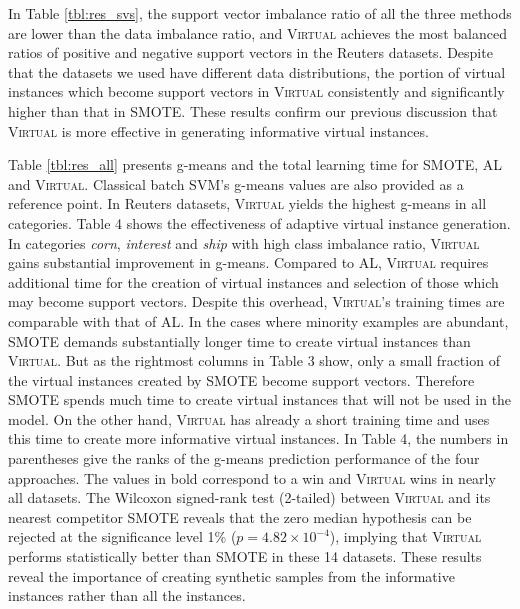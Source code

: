 In Table \ref{tbl:res_svs}, the support vector imbalance ratio of all the three methods are lower than the data imbalance ratio, and \textsc{Virtual} achieves the most balanced ratios of positive and negative support vectors in the Reuters datasets. Despite that the datasets we used have different data distributions, the portion of virtual instances which become support vectors in \textsc{Virtual} consistently and significantly higher than that in SMOTE. These results confirm our previous discussion that \textsc{Virtual} is more effective in generating informative virtual instances.

Table \ref{tbl:res_all} presents g-means and the total learning time for SMOTE, AL and  \textsc{Virtual}. Classical batch SVM's g-means values are also provided as a reference point. In Reuters datasets, \textsc{Virtual} yields the highest g-means in all categories. Table 4 shows the effectiveness of adaptive virtual instance generation. In categories \emph{corn}, \emph{interest} and \emph{ship} with high class imbalance ratio, \textsc{Virtual} gains substantial improvement in g-means. Compared to AL, \textsc{Virtual} requires additional time for the creation of virtual instances and selection of those which may become support vectors. Despite this overhead, \textsc{Virtual}'s training times are comparable with that of AL. In the cases where minority examples are abundant, SMOTE demands substantially longer time to create virtual instances than \textsc{Virtual}. But as the rightmost columns in Table 3 show, only a small fraction of the virtual instances created by SMOTE become support vectors. Therefore SMOTE spends much time to create virtual instances that will not be used in the model. On the other hand, \textsc{Virtual} has already a short training time and uses this time to create more informative virtual instances. In Table 4, the numbers in parentheses give the ranks of the g-means prediction performance of the four approaches. The values in bold correspond to a win and \textsc{Virtual} wins in nearly all datasets.  The Wilcoxon signed-rank test (2-tailed) between \textsc{Virtual} and its nearest competitor SMOTE reveals that the zero median hypothesis can be rejected at the significance level 1\% ($p=4.82 \times 10^{-4}$), implying that \textsc{Virtual} performs statistically better than SMOTE in these 14 datasets. These results reveal the importance of creating synthetic samples from the informative instances rather than all the instances.


